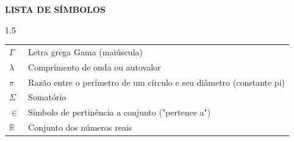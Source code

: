 
\begin{center}
  \textbf{LISTA DE SÍMBOLOS}
\end{center}

\vspace{1cm}

\begin{spacing}{1.5}
  \noindent
  \begin{tabular}{p{2.5cm} l}
    $\Gamma$  & Letra grega Gama (maiúscula) \\
    $\lambda$ & Comprimento de onda ou autovalor \\
    $\pi$     & Razão entre o perímetro de um círculo e seu diâmetro (constante pi) \\
    $\Sigma$  & Somatório \\
    $\in$     & Símbolo de pertinência a conjunto ("pertence a") \\
    $\mathbb{R}$ & Conjunto dos números reais \\
  \end{tabular}
\end{spacing}
